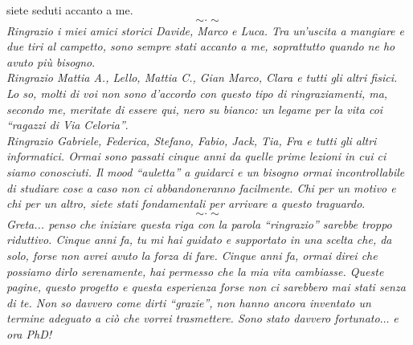 \begin{flushleft}
{    siete seduti accanto a me}.
  \[\sim\cdot\sim\]
  \textit{Ringrazio i miei amici storici Davide, Marco e Luca. Tra un'uscita a
    mangiare e due tiri al campetto, sono sempre stati accanto a me, soprattutto
    quando ne ho avuto più bisogno}.\\
  \vspace{2mm}
  \textit{Ringrazio Mattia A., Lello, Mattia C., Gian Marco, Clara e tutti gli
    altri fisici. Lo so, molti di voi non sono d'accordo con questo tipo di
    ringraziamenti, ma, secondo me, meritate di essere qui, nero su bianco: un
    legame per la vita coi ``ragazzi di Via Celoria''}.\\
  \vspace{2mm}
  \textit{Ringrazio Gabriele, Federica, Stefano, Fabio, Jack, Tia, Fra e tutti
    gli altri informatici. Ormai sono passati cinque anni da quelle prime
    lezioni in cui ci siamo conosciuti. Il mood ``auletta'' a guidarci e un
    bisogno ormai incontrollabile di studiare cose a caso non ci abbandoneranno
    facilmente. Chi per un motivo e chi per un altro, siete stati fondamentali
    per arrivare a questo traguardo}.
  \[\sim\cdot\sim\]
  \textit{Greta... penso che iniziare questa riga con la parola ``ringrazio''
    sarebbe troppo riduttivo. Cinque anni fa, tu mi hai guidato e supportato in
    una scelta che, da solo, forse non avrei avuto la forza di fare. Cinque
    anni fa, ormai direi che possiamo dirlo serenamente, hai permesso che la mia
    vita cambiasse. Queste pagine, questo progetto e questa esperienza forse non
    ci sarebbero mai stati senza di te. Non so davvero come dirti ``grazie'',
    non hanno ancora inventato un termine adeguato a ciò che vorrei
    trasmettere. Sono stato davvero fortunato$\ldots$ e ora PhD!}
\end{flushleft}